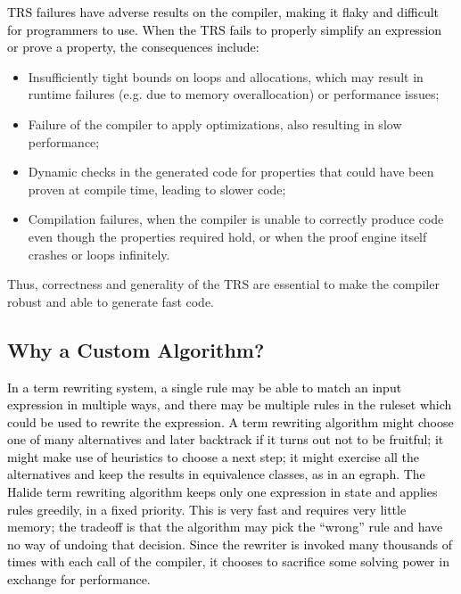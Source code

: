 \documentclass[acmsmall,review]{acmart}\settopmatter{printfolios=true,printccs=false,printacmref=false}
\newcommand{\modified}[1]{\textcolor{black}{{#1}}}
\begin{document}
\modified{TRS failures have adverse results on the compiler, making it flaky and
  difficult for programmers to use.  When the TRS fails to properly simplify an expression or
  prove a property, the consequences include: }
\begin{itemize}
\item Insufficiently tight bounds on loops and allocations, which may result in
  runtime failures (e.g. due to memory overallocation) or performance issues;

\item Failure of the compiler to apply optimizations, also resulting in slow performance;

\item Dynamic checks in the generated code for properties that could have been proven
  at compile time, leading to slower code;

\item Compilation failures, when the compiler is unable to correctly produce code
  even though the properties required hold, or when the proof engine itself crashes
  or loops infinitely.
\end{itemize}

Thus, correctness and generality of the TRS are essential to make the compiler
robust and able to generate fast code.

\subsection{Why a Custom Algorithm?}
\label{sec:whycustom}

\modified{In a term rewriting system, a single rule may be able to match an input expression in 
multiple ways, and there may be multiple rules in the ruleset which could be used 
to rewrite the expression. A term rewriting algorithm might choose one of many alternatives 
and later backtrack if it turns out not to be fruitful; it might make use of 
heuristics to choose a next step; it might exercise all the alternatives and keep 
the results in equivalence classes, as in an egraph. The Halide term rewriting algorithm
keeps only one expression in state and applies rules greedily, in a fixed priority.
This is very fast and requires very little memory; the tradeoff is that the algorithm 
may pick the ``wrong'' rule and have no way of undoing that decision. 
Since the rewriter is invoked many thousands of times with each call of the compiler, 
it chooses to sacrifice some solving power in exchange for performance.}
\end{document}
